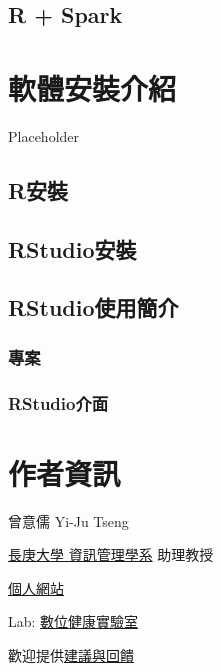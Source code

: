 \documentclass[]{book}
\begin{document}
\hypertarget{r-spark}{%
\section{R + Spark}\label{r-spark}}

\hypertarget{install}{%
\chapter{軟體安裝介紹}\label{install}}

Placeholder

\hypertarget{rux5b89ux88dd}{%
\section{R安裝}\label{rux5b89ux88dd}}

\hypertarget{rstudioux5b89ux88dd}{%
\section{RStudio安裝}\label{rstudioux5b89ux88dd}}

\hypertarget{rstudioux4f7fux7528ux7c21ux4ecb}{%
\section{RStudio使用簡介}\label{rstudioux4f7fux7528ux7c21ux4ecb}}

\hypertarget{ux5c08ux6848}{%
\subsection{專案}\label{ux5c08ux6848}}

\hypertarget{rstudioux4ecbux9762}{%
\subsection{RStudio介面}\label{rstudioux4ecbux9762}}

\hypertarget{author}{%
\chapter*{作者資訊}\label{author}}

曾意儒 Yi-Ju Tseng

\href{http://im.cgu.edu.tw/bin/home.php}{長庚大學 資訊管理學系} 助理教授

\href{http://yijutseng.github.io}{個人網站}

Lab: \href{https://dhlab-cgu.github.io/}{數位健康實驗室}

歡迎提供\href{https://goo.gl/forms/5Htobvwy2vsB7yiF3}{建議與回饋}


\end{document}
